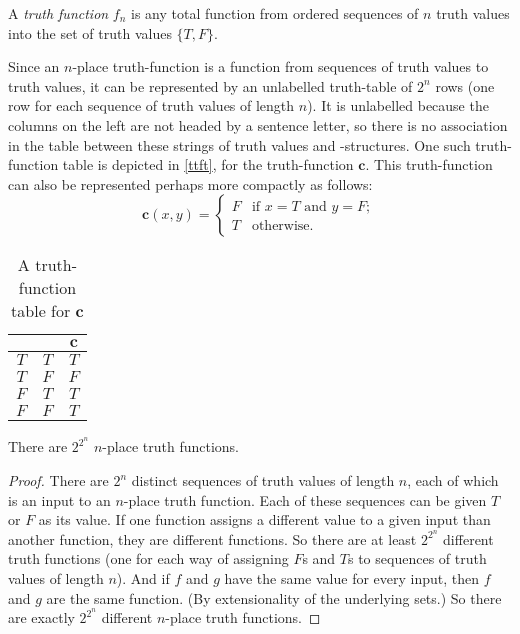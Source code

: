 \begin{definition}A \emph{truth function} $f_{n}$ is any total function from ordered sequences of $n$ truth values into the set of truth values $\{T,F\}$. \end{definition} 
Since an $n$-place truth-function is a function from sequences of truth values to truth values, it can be represented by an unlabelled truth-table of $2^{n}$ rows (one row for each sequence of truth values of length $n$). It is unlabelled because the columns on the left are not headed by a sentence letter, so there is no association in the table between these strings of truth values and \lone-structures. One such truth-function table is depicted in \autoref{ttft}, for the truth-function $\mathbf{c}$. This truth-function can also be represented perhaps more compactly as follows: $$\mathbf{c}(x,y) = \begin{cases} F &\text{if } x = T \text{ and } y = F;\\
T &\text{otherwise}.\end{cases}$$ 
\begin{table}[t]
	\centering
	\begin{tabular}{cc|c}
		\toprule
		& & $\mathbf{c}$ \\
		\midrule
		$T$ & $T$ & $T$  \\
		$T$ & $F$ & $F$ \\
		$F$ & $T$ & $T$ \\
		$F$ & $F$ & $T$ \\
		\bottomrule
	\end{tabular}
	\caption{A truth-function table for $\mathbf{c}$ \label{ttft}}
\end{table} 


\begin{theorem}
	There are $2^{2^{n}}$ $n$-place truth functions.\label{ntf}
	\begin{proof}
		There are $2^{n}$ distinct sequences of truth values of length $n$, each of which is an input to an $n$-place truth function. Each of these sequences can be given $T$ or $F$ as its value. If one function assigns a different value to a given input than another function, they are different functions. So there are at least $2^{2^{n}}$ different truth functions (one for each way of assigning $F$s and $T$s to sequences of truth values of length $n$). And if $f$ and $g$ have the same value for every input, then $f$ and $g$ are the same function. (By extensionality of the underlying sets.) So there are exactly $2^{2^{n}}$ different $n$-place truth functions.
	\end{proof}
\end{theorem}

